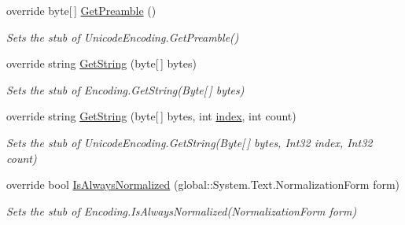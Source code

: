 \begin{DoxyCompactItemize}
override byte\mbox{[}$\,$\mbox{]} \hyperlink{class_system_1_1_text_1_1_fakes_1_1_stub_unicode_encoding_a7678aeddfb197644dc3de766d715f460}{Get\-Preamble} ()
\begin{DoxyCompactList}\small\item\em Sets the stub of Unicode\-Encoding.\-Get\-Preamble()\end{DoxyCompactList}\item 
override string \hyperlink{class_system_1_1_text_1_1_fakes_1_1_stub_unicode_encoding_a44f1806f28ad8bc78c5a4615196061ae}{Get\-String} (byte\mbox{[}$\,$\mbox{]} bytes)
\begin{DoxyCompactList}\small\item\em Sets the stub of Encoding.\-Get\-String(\-Byte\mbox{[}$\,$\mbox{]} bytes)\end{DoxyCompactList}\item 
override string \hyperlink{class_system_1_1_text_1_1_fakes_1_1_stub_unicode_encoding_a6839cc05336017ae28dca5b2efb64cbd}{Get\-String} (byte\mbox{[}$\,$\mbox{]} bytes, int \hyperlink{jquery-1_810_82-vsdoc_8js_a75bb12d1f23302a9eea93a6d89d0193e}{index}, int count)
\begin{DoxyCompactList}\small\item\em Sets the stub of Unicode\-Encoding.\-Get\-String(\-Byte\mbox{[}$\,$\mbox{]} bytes, Int32 index, Int32 count)\end{DoxyCompactList}\item 
override bool \hyperlink{class_system_1_1_text_1_1_fakes_1_1_stub_unicode_encoding_a6f77f8656d02db172466274742377b16}{Is\-Always\-Normalized} (global\-::\-System.\-Text.\-Normalization\-Form form)
\begin{DoxyCompactList}\small\item\em Sets the stub of Encoding.\-Is\-Always\-Normalized(\-Normalization\-Form form)\end{DoxyCompactList}\end{DoxyCompactItemize}
